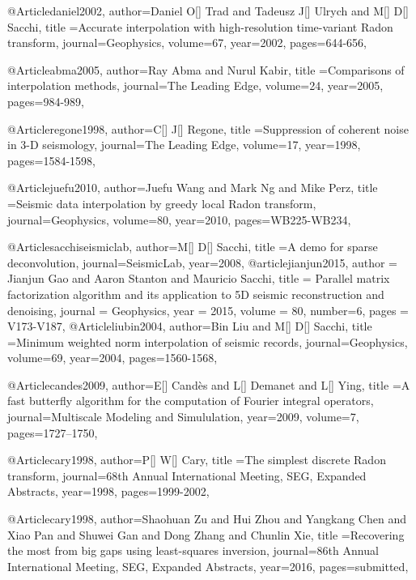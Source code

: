 @Article{daniel2002,
  author={Daniel O[] Trad and Tadeusz J[] Ulrych and M[] D[] Sacchi},
  title ={Accurate interpolation with high-resolution time-variant Radon transform},
  journal={Geophysics},
  volume=67,
  year=2002,
  pages={644-656},
}

@Article{abma2005,
  author={Ray Abma and Nurul Kabir},
  title ={Comparisons of interpolation methods},
  journal={The Leading Edge},
  volume=24,
  year=2005,
  pages={984-989},
}

@Article{regone1998,
  author={C[] J[] Regone},
  title ={Suppression of coherent noise in 3-{D} seismology},
  journal={The Leading Edge},
  volume=17,
  year=1998,
  pages={1584-1598},
}

@Article{juefu2010,
  author={Juefu Wang and Mark Ng and Mike Perz},
  title ={Seismic data interpolation by greedy local Radon transform},
  journal={Geophysics},
  volume=80,
  year=2010,
  pages={WB225-WB234},
}

@Article{sacchiseismiclab,
  author={M[] D[] Sacchi},
  title ={A demo for sparse deconvolution},
  journal={SeismicLab},
  year={2008},
}
@article{jianjun2015,
  author =	 {Jianjun Gao and Aaron Stanton and Mauricio Sacchi},
  title =	 {Parallel matrix factorization algorithm and its application to 5{D} seismic reconstruction and denoising},
  journal = 	 {Geophysics},
  year = 	 2015,
  volume =	 80,
    number=6,
  pages =	 {V173-V187},
}
@Article{liubin2004,
  author={Bin Liu and M[] D[] Sacchi},
  title ={Minimum weighted norm interpolation of seismic records},
  journal={Geophysics},
  volume=69,
  year=2004,
  pages={1560-1568},
}

@Article{candes2009,
  author={E[] Cand\`{e}s and L[] Demanet and L[] Ying},
  title ={A fast butterfly algorithm for the computation of Fourier integral operators},
  journal={Multiscale Modeling and Simululation},
  year=2009,
  volume=7,
  pages={1727–1750},
}

@Article{cary1998,
  author={P[] W[] Cary},
  title ={The simplest discrete Radon transform},
  journal={68th Annual International Meeting, SEG, Expanded Abstracts},
  year=1998,
  pages={1999-2002},
}


@Article{cary1998,
  author={Shaohuan Zu and Hui Zhou and Yangkang Chen and Xiao Pan and Shuwei Gan and Dong Zhang and Chunlin Xie},
  title ={Recovering the most from big gaps using least-squares inversion},
  journal={86th Annual International Meeting, SEG, Expanded Abstracts},
  year=2016,
  pages={submitted},
}



